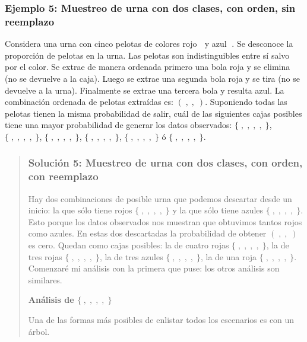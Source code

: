 \documentclass[
]{book}
\newenvironment{Ejemplo}
{\begin{mdframed}[
  linecolor=ejemplocolor,
  skipabove=12pt,
  skipbelow=12pt,
  roundcorner=20pt,
  splittopskip=2\topsep]}
{\end{mdframed}}
\begin{document}
\begin{Ejemplo}
\hypertarget{ejemplo-5-muestreo-de-urna-con-dos-clases-con-orden-sin-reemplazo}{%
\subsubsection{Ejemplo 5: Muestreo de urna con dos clases, con orden,
sin
reemplazo}\label{ejemplo-5-muestreo-de-urna-con-dos-clases-con-orden-sin-reemplazo}}

Considera una urna con cinco pelotas de colores rojo 🔴 y azul 🔵. Se
desconoce la proporción de pelotas en la urna. Las pelotas son
indistinguibles entre sí salvo por el color. Se extrae de manera
ordenada primero una bola roja y se elimina (no se devuelve a la caja).
Luego se extrae una segunda bola roja y se tira (no se devuelve a la
urna). Finalmente se extrae una tercera bola y resulta azul. La
combinación ordenada de pelotas extraídas es: \(( 🔴, 🔴, 🔵)\). Suponiendo
todas las pelotas tienen la misma probabilidad de salir, cuál de las
siguientes cajas posibles tiene una mayor probabilidad de generar los
datos observados: \(\{ 🔴, 🔴, 🔴, 🔴, 🔴\}\), \(\{ 🔴, 🔴, 🔴, 🔴, 🔵\}\),
\(\{ 🔴, 🔴, 🔴, 🔵, 🔵\}\), \(\{ 🔴, 🔴, 🔵, 🔵, 🔵\}\), \(\{ 🔴, 🔵, 🔵, 🔵, 🔵\}\) ó
\(\{ 🔵, 🔵, 🔵, 🔵, 🔵\}\).

\begin{quote}
\hypertarget{soluciuxf3n-5-muestreo-de-urna-con-dos-clases-con-orden-con-reemplazo}{%
\subsubsection{Solución 5: Muestreo de urna con dos clases, con orden,
con
reemplazo}\label{soluciuxf3n-5-muestreo-de-urna-con-dos-clases-con-orden-con-reemplazo}}

Hay dos combinaciones de posible urna que podemos descartar desde un
inicio: la que sólo tiene rojos \(\{ 🔴, 🔴, 🔴, 🔴, 🔴\}\) y la que sólo
tiene azules \(\{ 🔵, 🔵, 🔵, 🔵, 🔵\}\). Esto porque los datos observados
nos muestran que obtuvimos tantos rojos como azules. En estas dos
descartadas la probabilidad de obtener \(( 🔴, 🔴, 🔵)\) es cero. Quedan
como cajas posibles: la de cuatro rojas \(\{ 🔴, 🔴, 🔴, 🔴, 🔵\}\), la de
tres rojas \(\{ 🔴, 🔴, 🔴, 🔵, 🔵\}\), la de tres azules
\(\{ 🔴, 🔴, 🔵, 🔵, 🔵\}\), la de una roja \(\{ 🔴, 🔵, 🔵, 🔵, 🔵\}\). Comenzaré
mi análisis con la primera que puse: los otros análisis son similares.

\textbf{Análisis de \(\{ 🔴, 🔴, 🔴, 🔴, 🔵\}\)}

Una de las formas más posibles de enlistar todos los escenarios es con
un árbol.
\end{quote}
\end{Ejemplo}
\end{document}
